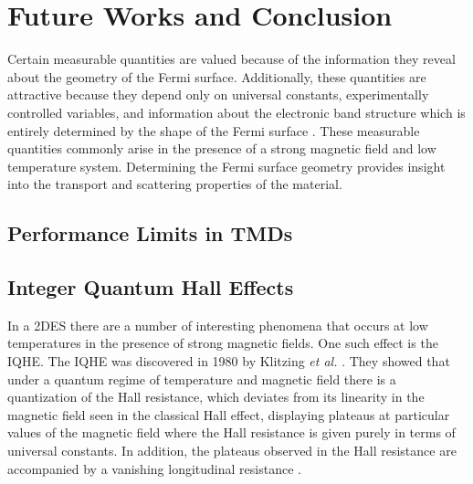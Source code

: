 \chapter{Future Works and Conclusion}\label{chap:conclusion}
Certain measurable quantities are valued because of the information they reveal about the geometry of the Fermi surface. Additionally, these quantities are attractive because they depend only on universal constants, experimentally controlled variables, and information about the electronic band structure which is entirely determined by the shape of the Fermi surface \cite{Ashcroft_SolidStatePhysics1978}. These measurable quantities commonly arise in the presence of a strong magnetic field and low temperature system. Determining the Fermi surface geometry provides insight into the transport and scattering properties of the material.

\section{Performance Limits in \acp{TMD}}\label{sec:performance_limits}

\section{Integer Quantum Hall Effects}\label{sec:IQHE}
In a \ac{2DES} there are a number of interesting phenomena that occurs at low temperatures in the presence of strong magnetic fields. One such effect is the \ac{IQHE}. The \acs{IQHE} was discovered in 1980 by Klitzing \emph{et al.} \cite{Klitzing_PhysRevLett1980}. They showed that under a quantum regime of temperature and magnetic field there is a quantization of the Hall resistance, which deviates from its linearity in the magnetic field seen in the classical Hall effect, displaying plateaus at particular values of the magnetic field where the Hall resistance is given purely in terms of universal constants. In addition, the plateaus observed in the Hall resistance are accompanied by a vanishing longitudinal resistance \cite{Klitzing_PhysRevLett1980,Ando_RevModPhys1982,Goerbig_2009,Hook_Solid1991}.

